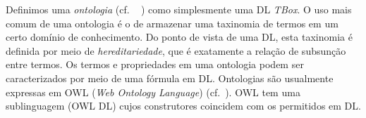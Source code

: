 \documentclass[hyphens,11pt,a4paper]{article}
\begin{document}
	Definimos uma {\it ontologia} (cf. ~\cite{Gruber} ) como simplesmente uma DL \emph{TBox}.  O uso mais comum de uma ontologia é o de armazenar uma taxinomia de termos em um certo domínio de conhecimento. Do ponto de vista de uma DL, esta taxinomia é definida por meio de \emph{hereditariedade}, que é exatamente a relação de subsunção entre termos. Os termos e propriedades em uma ontologia podem ser caracterizados por meio de uma fórmula em DL.
	 Ontologias são usualmente  expressas em OWL ({\it Web Ontology Language}) (cf.~\cite{Dean}). OWL tem uma sublinguagem (OWL DL) cujos construtores coincidem com os permitidos em DL. 

%


%
%
\end{document}

